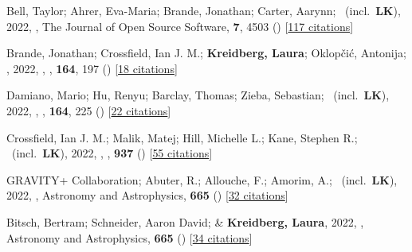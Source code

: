 \item[{\color{numcolor}\scriptsize73}] Bell, Taylor; Ahrer, Eva-Maria; Brande, Jonathan; Carter, Aarynn; \etal\ (incl.\ \textbf{LK}), 2022, , The Journal of Open Source Software, \textbf{7}, 4503 () [\href{https://ui.adsabs.harvard.edu/abs/2022JOSS....7.4503B}{117 citations}]

\item[{\color{numcolor}\scriptsize72}] Brande, Jonathan; Crossfield, Ian J. M.; \textbf{Kreidberg, Laura}; Oklop{\v{c}}i{\'c}, Antonija; \etal, 2022, , \aj, \textbf{164}, 197 () [\href{https://ui.adsabs.harvard.edu/abs/2022AJ....164..197B}{18 citations}]

\item[{\color{numcolor}\scriptsize71}] Damiano, Mario; Hu, Renyu; Barclay, Thomas; Zieba, Sebastian; \etal\ (incl.\ \textbf{LK}), 2022, , \aj, \textbf{164}, 225 () [\href{https://ui.adsabs.harvard.edu/abs/2022AJ....164..225D}{22 citations}]

\item[{\color{numcolor}\scriptsize70}] Crossfield, Ian J. M.; Malik, Matej; Hill, Michelle L.; Kane, Stephen R.; \etal\ (incl.\ \textbf{LK}), 2022, , \apj, \textbf{937} () [\href{https://ui.adsabs.harvard.edu/abs/2022ApJ...937L..17C}{55 citations}]

\item[{\color{numcolor}\scriptsize69}] GRAVITY+ Collaboration; Abuter, R.; Allouche, F.; Amorim, A.; \etal\ (incl.\ \textbf{LK}), 2022, , Astronomy and Astrophysics, \textbf{665} () [\href{https://ui.adsabs.harvard.edu/abs/2022A&A...665A..75G}{32 citations}]

\item[{\color{numcolor}\scriptsize68}] Bitsch, Bertram; Schneider, Aaron David; \& \textbf{Kreidberg, Laura}, 2022, , Astronomy and Astrophysics, \textbf{665} () [\href{https://ui.adsabs.harvard.edu/abs/2022A&A...665A.138B}{34 citations}]

